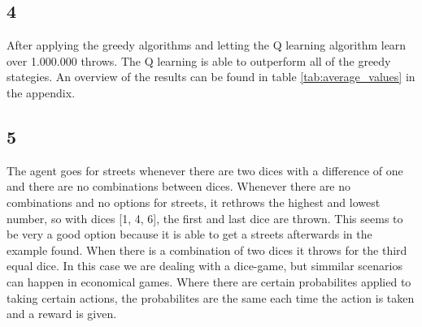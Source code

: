 \subsection*{4}
After applying the greedy algorithms and letting the Q learning algorithm learn over 1.000.000 throws. The Q learning is able to outperform all of the greedy stategies. An overview of the results can be found in table \ref{tab:average_values} in the appendix.
\subsection*{5}
The agent goes for streets whenever there are two dices with a difference of one and there are no combinations between dices. Whenever there are no combinations and no options for streets, it rethrows the highest and lowest number, so with dices [1, 4, 6], the first and last dice are thrown. This seems to be very a good option because it is able to get a streets afterwards in the example found. When there is a combination of two dices it throws for the third equal dice. In this case we are dealing with a dice-game, but simmilar scenarios can happen in economical games. Where there are certain probabilites applied to taking certain actions, the probabilites are the same each time the action is taken and a reward is given.

